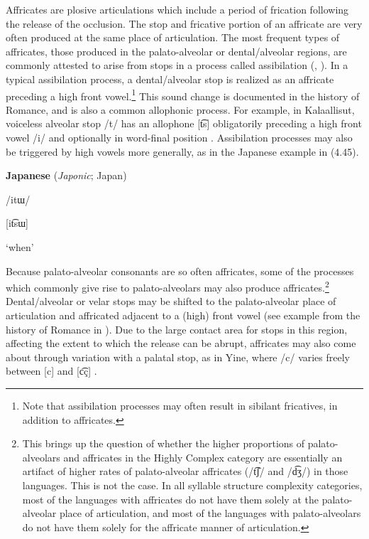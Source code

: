   Affricates are plosive articulations which include a period of frication following the release of the occlusion. The stop and fricative portion of an affricate are very often produced at the same place of articulation. The most frequent types of affricates, those produced in the palato-alveolar or dental/alveolar regions, are commonly attested to arise from stops in a process called assibilation (\citealt{HallHamann2006}, \citealt{Telfer2006}). In a typical assibilation process, a dental/alveolar stop is realized as an affricate preceding a high front vowel.\footnote{ \textrm{Note that assibilation processes may often result in sibilant fricatives, in addition to affricates.}} This sound change is documented in the history of Romance, and is also a common allophonic process. For example, in Kalaallisut, voiceless alveolar stop /t/ has an allophone [t͡s] obligatorily preceding a high front vowel /i/ and optionally in word-final position \citep[333]{Fortescue1984}. Assibilation processes may also be triggered by high vowels more generally, as in the Japanese example in (4.45).



\ea\label{ex:(4.45)}
  \textbf{Japanese} (\textit{Japonic}; Japan)



/itɯ/



[it͡sɯ]



‘when’



\citep[22]{Tsujimura2013}

\z


  Because palato-alveolar consonants are so often affricates, some of the processes which commonly give rise to palato-alveolars may also produce affricates.\footnote{ \textrm{This brings up the question of whether the higher proportions of palato-alveolars and affricates in the Highly Complex category are essentially an artifact of higher rates of palato-alveolar affricates (/t͡ʃ/ and /d͡ʒ/) in those languages. This is not the case. In all syllable structure complexity categories, most of the languages with affricates do not have them solely at the palato-alveolar place of articulation, and most of the languages with palato-alveolars do not have them solely for the affricate manner of articulation.}} Dental/alveolar or velar stops may be shifted to the palato-alveolar place of articulation and affricated adjacent to a (high) front vowel (see example from the history of Romance in ). Due to the large contact area for stops in this region, affecting the extent to which the release can be abrupt, affricates may also come about through variation with a palatal stop, as in Yine, where /c/ varies freely between [c] and [c͡ç] \citep[17-18]{Hanson2010}.



